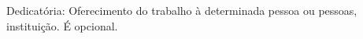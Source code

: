 
\begin{dedicatoria}%
Dedicatória: Oferecimento do trabalho à determinada pessoa ou pessoas, instituição. É opcional.
\end{dedicatoria}
